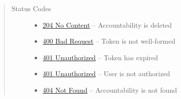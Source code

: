 \documentclass[letterpaper,10pt,english]{sphinxmanual}
\begin{document}
\begin{fulllineitems}
\begin{quote}
\begin{description}
\begin{itemize}
\end{itemize}

\item[{Status Codes}] \leavevmode\begin{itemize}
\item {} 
\href{http://www.w3.org/Protocols/rfc2616/rfc2616-sec10.html\#sec10.2.5}{204 No Content} -- Accountability is deleted

\item {} 
\href{http://www.w3.org/Protocols/rfc2616/rfc2616-sec10.html\#sec10.4.1}{400 Bad Request} -- Token is not well-formed

\item {} 
\href{http://www.w3.org/Protocols/rfc2616/rfc2616-sec10.html\#sec10.4.2}{401 Unauthorized} -- Token has expired

\item {} 
\href{http://www.w3.org/Protocols/rfc2616/rfc2616-sec10.html\#sec10.4.2}{401 Unauthorized} -- User is not authorized

\item {} 
\href{http://www.w3.org/Protocols/rfc2616/rfc2616-sec10.html\#sec10.4.5}{404 Not Found} -- Accountability is not found

\end{itemize}

\end{description}\end{quote}

\end{fulllineitems}
\end{document}
